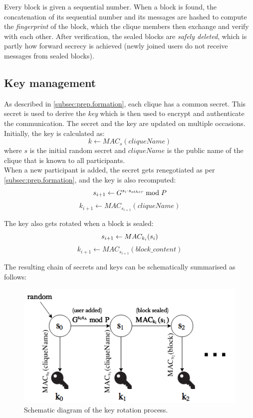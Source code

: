 \documentclass[a4paper, twoside, 12pt]{report}
\begin{document}
Every block is given a sequential number. When a block is found, the concatenation of its sequential number and its messages are hashed to compute the \emph{fingerprint} of the block, which the clique members then exchange and verify with each other. After verification, the sealed blocks are \emph{safely deleted}, which is partly how forward secrecy is achieved (newly joined users do not receive messages from sealed blocks).


\subsection{Key management}
\label{subsec:prep.keyman}
As described in \cref{subsec:prep.formation}, each clique has a common secret. This secret is used to derive the \emph{key} which is then used to encrypt and authenticate the communication. The secret and the key are updated on multiple occasions. Initially, the key is calculated as:
\begin{equation*}
    k \leftarrow MAC_{s}(cliqueName)
\end{equation*}
where $s$ is the initial random secret and $cliqueName$ is the public name of the clique that is known to all participants. \\ 

When a new participant is added, the secret gets renegotiated as per \cref{subsec:prep.formation}, and the key is also recomputed: \\
\[
    s_{i+1} \leftarrow G^{s_i \cdot s_{other}} \bmod P  \\ 
\]
\[
    k_{i+1} \leftarrow MAC_{s_{i+1}}(cliqueName)
\]
\vspace{1pt}


The key also gets rotated when a block is sealed:
\[
    s_{i+1} \leftarrow MAC_{k_i}(s_i) \\ 
\]
\[
    k_{i+1} \leftarrow MAC_{s_{i+1}}(block\_content)
\]
\vspace{1pt}

The resulting chain of secrets and keys can be schematically summarised as follows:
\begin{figure}[H]
    \centering
    \includegraphics[width = 0.68 \linewidth]{pics/keys_secrets.png}
    \caption{\label{fig:keys_secrets}Schematic diagram of the key rotation process.}
\end{figure}
\end{document}
